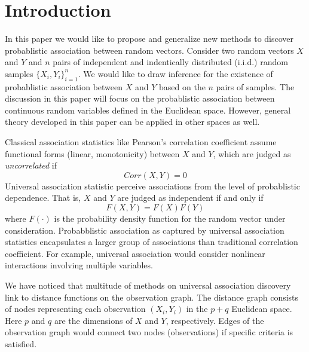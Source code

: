 \documentclass{sig-alternate}
\begin{document}


\section{Introduction}
\label{sec:intro}

In this paper we would like to propose and generalize new methods to
discover probablistic association between random vectors. Consider two
random vectors $X$ and $Y$ and $n$ pairs of independent and
indentically distributed (i.i.d.) random samples $\{X_i,
Y_i\}_{i=1}^n$. We would like to draw inference for the existence of
probablistic association between $X$ and $Y$ based on the $n$ pairs of
samples. The discussion in this paper will focus on the probablistic
association between continuous random variables defined in the
Euclidean space. However, general theory developed in this paper can
be applied in other spaces as well.

Classical association statistics like Pearson's correlation
coefficient assume functional forms (linear, monotonicity) between $X$
and $Y$, which are judged as \emph{uncorrelated} if
\begin{displaymath}
  Corr(X,Y)=0
\end{displaymath}
Universal association statistic perceive associations from the level
of probablistic dependence. That is, $X$ and $Y$ are judged as
independent if and only if
\begin{equation}
  \label{eq:independence}
  F(X,Y)= F(X) F(Y)
\end{equation}
where $F(\cdot)$ is the probability density function for the random
vector under consideration. Probabblistic association as captured by
universal association statistics encapsulates a larger group of
associations than traditional correlation coefficient. For example,
universal association would consider nonlinear interactions involving
multiple variables. 

We have noticed that multitude of methods on universal association
discovery link to distance functions on the observation graph. The
distance graph consists of nodes representing each observation $(X_i,
Y_i)$ in the $p+q$ Euclidean space. Here $p$ and $q$ are the
dimensions of $X$ and $Y$, respectively. Edges of the observation
graph would connect two nodes (observations) if specific criteria is
satisfied.
\end{document}
